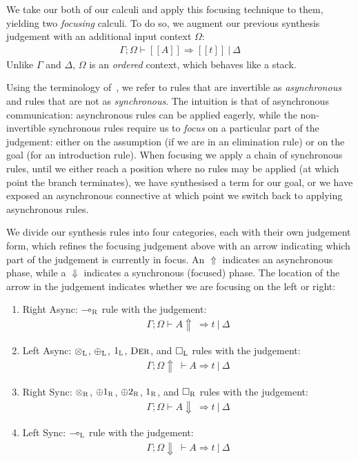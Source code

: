 We take our both of our calculi and apply this focusing technique to them,
yielding two \textit{focusing} calculi. To do so, we augment our previous
synthesis judgement with an additional input context $\Omega$:
\begin{align*}
\Gamma ; \Omega \vdash [[ A ]] \Rightarrow [[t ]]\ |\ \Delta
\end{align*}
Unlike $\Gamma$ and $\Delta$, $\Omega$ is an \textit{ordered} context, which 
behaves like a stack.

Using the terminology of~\citet{focusing}, we refer to rules that are invertible
as \textit{asynchronous} and rules that are not as \textit{synchronous}. The
intuition is that of asynchronous communication: asynchronous rules can be
applied eagerly, while the non-invertible synchronous rules require us to
\textit{focus} on a particular part of the judgement: either on the assumption
(if we are in an elimination rule) or on the goal (for an introduction rule).
When focusing we apply a chain of synchronous rules, until we either reach a
position where no rules may be applied (at which point the branch terminates),
we have synthesised a term for our goal, or we have exposed an asynchronous
connective at which point we switch back to applying asynchronous rules.

We divide our synthesis rules into four categories, each with their own
judgement form, which refines the focusing judgement above with an arrow
indicating which part of the judgement is currently in focus. An $\Uparrow$
indicates an asynchronous phase, while a $\Downarrow$ indicates a synchronous
(focused) phase. The location of the arrow in the judgement indicates whether we
are focusing on the left or right:
\begin{enumerate}
  \item Right Async: $\multimap_{\textsc{R}}$ rule with the judgement:
        \begin{align*}\Gamma ; \Omega \vdash A \Uparrow\ \Rightarrow t\ |\ \Delta \end{align*}
        \item Left Async:  $\otimes_{\textsc{L}}$, $\oplus_{\textsc{L}}$, $1_{\textsc{L}}$, $\textsc{Der}$, and $\Box_{\textsc{L}}$ rules with the judgement:
        \begin{align*}\Gamma ; \Omega \Uparrow\ \vdash A \Rightarrow t\ |\ \Delta \end{align*}
        \item Right Sync:  $\otimes_{\textsc{R}}$, $\oplus1_{\textsc{R}}$, $\oplus2_{\textsc{R}}$, $1_{\textsc{R}}$, and $\Box_{\textsc{R}}$ rules with the judgement:
        \begin{align*}\Gamma ; \Omega \vdash A \Downarrow\ \Rightarrow t\ |\ \Delta \end{align*}
        \item Left Sync:   $\multimap_{\textsc{L}}$ rule with the judgement:
        \begin{align*}\Gamma ; \Omega \Downarrow\ \vdash A \Rightarrow t\ |\ \Delta \end{align*}
\end{enumerate}

